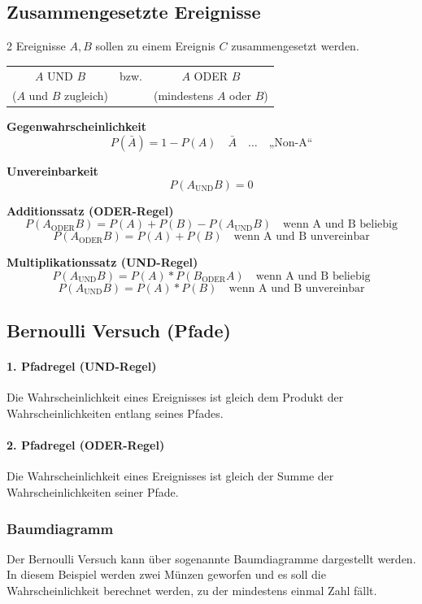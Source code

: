 \documentclass{school}
\begin{document}
\subsection{Zusammengesetzte Ereignisse}
2 Ereignisse $A, B$ sollen zu einem Ereignis $C$ zusammengesetzt werden.
\begin{center}
\begin{tabularx}{0.5\textwidth}{c c c}
	$A$ UND $B$ & bzw. & $A$ ODER $B$\\
	{\small ($A$ und $B$ zugleich)} & & {\small (mindestens $A$ oder $B$)}
\end{tabularx}
\end{center}

\begin{outline}
\1 \textbf{Gegenwahrscheinlichkeit}
$$P(\bar{A}) = 1 - P(A) \quad \bar{A} \quad \dots \quad \text{„Non-A“}$$

\1 \textbf{Unvereinbarkeit}
$$P(A_{\text{UND}}B) = 0$$

\1 \textbf{Additionssatz {\footnotesize(ODER-Regel)}}
$$P(A_{\text{ODER}}B) = P(A) + P(B) - P(A_{\text{UND}}B) \quad \text{wenn A und B beliebig}$$
$$P(A_{\text{ODER}}B) = P(A) + P(B) \quad \text{wenn A und B unvereinbar}$$

\1 \textbf{Multiplikationssatz \small{(UND-Regel)}}
$$P(A_{\text{UND}}B) = P(A) * P(B_{\text{ODER}}A) \quad \text{wenn A und B beliebig}$$
$$P(A_{\text{UND}}B) = P(A) * P(B) \quad \text{wenn A und B unvereinbar}$$
\end{outline}

\newpage
\subsection{Bernoulli Versuch \normalsize{(Pfade)}}
\paragraph{1. Pfadregel \small{(UND-Regel)}} Die Wahrscheinlichkeit eines Ereignisses ist gleich dem Produkt der Wahrscheinlichkeiten entlang seines Pfades.
\paragraph{2. Pfadregel \small{(ODER-Regel)}} Die Wahrscheinlichkeit eines Ereignisses ist gleich der Summe der Wahrscheinlichkeiten seiner Pfade.

\subsubsection{Baumdiagramm}
Der Bernoulli Versuch kann über sogenannte Baumdiagramme dargestellt werden. In diesem Beispiel werden zwei Münzen geworfen und es soll die Wahrscheinlichkeit berechnet werden, zu der mindestens einmal Zahl fällt.
\end{document}
